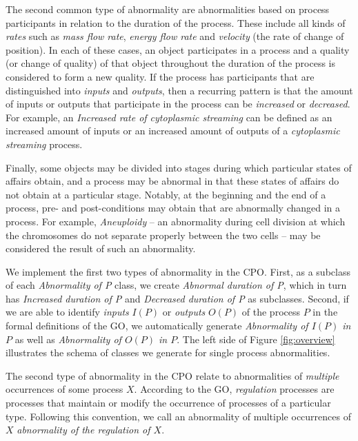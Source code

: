 \documentclass[11pt]{article}
\begin{document}
The second common type of abnormality are abnormalities based on
process participants in relation to the duration of the process. These
include all kinds of {\em rates} such as {\em mass flow rate}, {\em
  energy flow rate} and {\em velocity} (the rate of change of
position). In each of these cases, an object participates in a process
and a quality (or change of quality) of that object throughout the
duration of the process is considered to form a new quality. If the
process has participants that are distinguished into {\em inputs} and
{\em outputs}, then a recurring pattern is that the amount of inputs
or outputs that participate in the process can be {\em increased} or
{\em decreased}. For example, an {\em Increased rate of cytoplasmic
  streaming} can be defined as an increased amount of inputs or an
increased amount of outputs of a {\em cytoplasmic streaming} process.

Finally, some objects may be divided into stages during which
particular states of affairs obtain, and a process may be abnormal in
that these states of affairs do not obtain at a particular
stage. Notably, at the beginning and the end of a process, pre- and
post-conditions may obtain that are abnormally changed in a
process. For example, {\em Aneuploidy} -- an abnormality during cell
division at which the chromosomes do not separate properly between the
two cells -- may be considered the result of such an abnormality.

We implement the first two types of abnormality in the CPO. First, as
a subclass of each {\em Abnormality of P} class, we create {\em
  Abnormal duration of P}, which in turn has {\em Increased duration
  of P} and {\em Decreased duration of P} as subclasses. Second, if we
are able to identify {\em inputs} $I(P)$ or {\em outputs} $O(P)$ of
the process $P$ in the formal definitions of the GO, we automatically
generate {\em Abnormality of $I(P)$ in $P$} as well as {\em
  Abnormality of $O(P)$ in $P$}.  The left side of Figure
\ref{fig:overview} illustrates the schema of classes we generate for
single process abnormalities.

The second type of abnormality in the CPO relate to abnormalities of
{\em multiple} occurrences of some process $X$. According to the GO,
{\em regulation} processes are processes that maintain or modify the
occurrence of processes of a particular type. Following this
convention, we call an abnormality of multiple occurrences of $X$ {\em
  abnormality of the regulation of $X$}.
\end{document}

